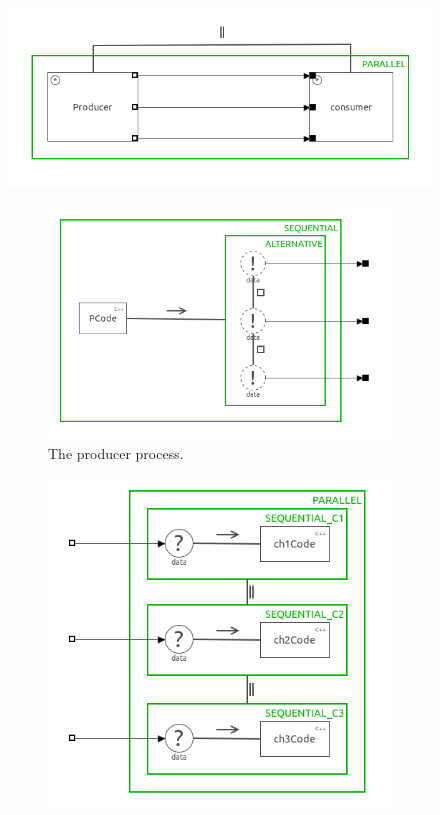 \documentclass[a4paper,twoside,11pt]{article}
\begin{document}
\begin{figure}
 \centering
 \includegraphics[scale=0.7]{./images/2-1_overview.png}
 \caption{Overview diagram of the multiple channel producer consumer system.}
 \label{fig:typicalcspoverview}
 \begin{subfigure}{0.5\textwidth}
  \centering
  \includegraphics[width=\textwidth]{./images/2-1_producer.png}
	\caption{The producer process.}
 \end{subfigure}%
 \begin{subfigure}{0.5\textwidth}
  \centering
  \includegraphics[width=\textwidth]{./images/2-1_consumer.png}

\end{subfigure}
\end{figure}
\end{document}
